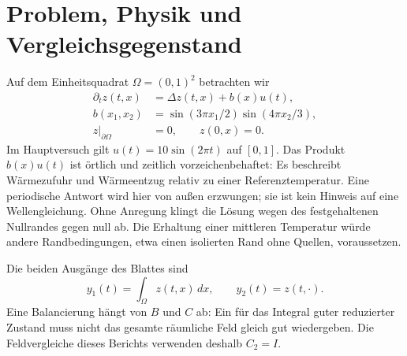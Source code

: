 \documentclass[11pt,a4paper]{article}
\begin{document}
\section{Problem, Physik und Vergleichsgegenstand}
Auf dem Einheitsquadrat $\Omega=(0,1)^2$ betrachten wir
\begin{align}
 \partial_t z(t,x)&=\Delta z(t,x)+b(x)u(t),\\
 b(x_1,x_2)&=\sin(3\pi x_1/2)\sin(4\pi x_2/3),\\
 z|_{\partial\Omega}&=0,\qquad z(0,x)=0.
\end{align}
Im Hauptversuch gilt $u(t)=10\sin(2\pi t)$ auf $[0,1]$. Das Produkt $b(x)u(t)$ ist örtlich und zeitlich vorzeichenbehaftet: Es beschreibt Wärmezufuhr und Wärmeentzug relativ zu einer Referenztemperatur. Eine periodische Antwort wird hier von außen erzwungen; sie ist kein Hinweis auf eine Wellengleichung. Ohne Anregung klingt die Lösung wegen des festgehaltenen Nullrandes gegen null ab. Die Erhaltung einer mittleren Temperatur würde andere Randbedingungen, etwa einen isolierten Rand ohne Quellen, voraussetzen.

Die beiden Ausgänge des Blattes sind
\begin{equation}
 y_1(t)=\int_\Omega z(t,x)\,dx,\qquad y_2(t)=z(t,\cdot).
\end{equation}
Eine Balancierung hängt von $B$ und $C$ ab: Ein für das Integral guter reduzierter Zustand muss nicht das gesamte räumliche Feld gleich gut wiedergeben. Die Feldvergleiche dieses Berichts verwenden deshalb $C_2=I$.
\end{document}

